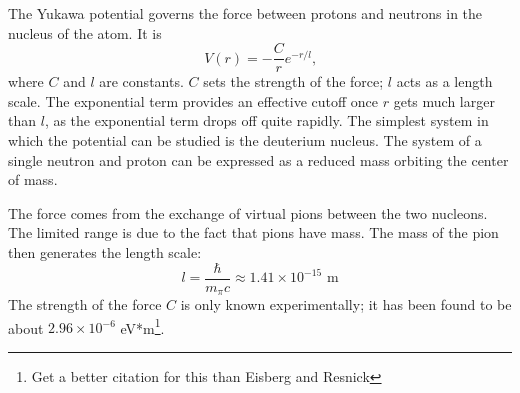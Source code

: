 \documentclass[12pt,twoside]{reedthesis}
\newcommand{\eqn}[1]{\begin{equation}#1\end{equation}}
\begin{document}

The Yukawa potential governs the force between protons and neutrons in the nucleus of the atom. It is
\eqn{
V(r) = -\frac{C}{r}e^{-r/l}\mbox{,}
}
where $C$ and $l$ are constants. $C$ sets the strength of the force; $l$ acts as a length scale. The exponential term provides an effective cutoff once $r$ gets much larger than $l$, as the exponential term drops off quite rapidly. The simplest system in which the potential can be studied is the deuterium nucleus. The system of a single neutron and proton can be expressed as a reduced mass orbiting the center of mass.

The force comes from the exchange of virtual pions between the two nucleons. The limited range is due to the fact that pions have mass. The mass of the pion then generates the length scale:
\eqn{
l = \frac{\hbar}{m_{\pi}c} \approx 1.41 \times 10^{-15}\mbox{ m}
}
The strength of the force $C$ is only known experimentally; it has been found to be about $2.96 \times 10^{-6}$ eV*m\cite{ER}\footnote{Get a better citation for this than Eisberg and Resnick}. 
\end{document}
